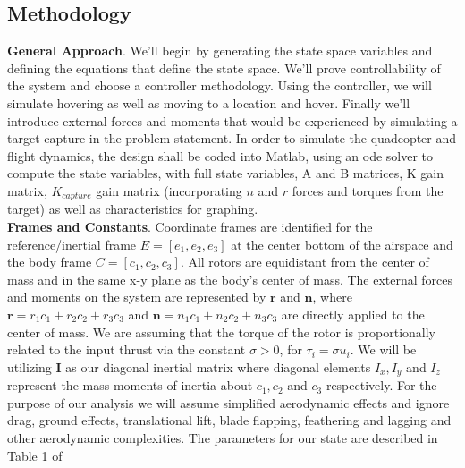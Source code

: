 \documentclass{article}
\begin{document}
\begin{multicols}{2}
\section*{Methodology}
\textbf{General Approach}.  We'll begin by generating the state space variables and defining the equations that define the state space.  We'll prove 
controllability of the system and choose a controller methodology.  Using the controller, we will simulate hovering as well as moving to a 
location and hover.  Finally we'll introduce external forces and moments that would be experienced by simulating a target capture in the 
problem statement.  In order to simulate the quadcopter and flight dynamics, the design shall be coded into Matlab, using an ode solver to compute the state variables, with full state variables, A and B matrices, K gain matrix, $K_{capture}$ gain matrix (incorporating $n$ and $r$ forces and torques from the target) 
as well as characteristics for graphing.\\
\noindent \textbf{Frames and Constants}.  Coordinate frames are identified for the reference/inertial frame $E={[e_1, e_2, e_3]}$ at the center bottom of the airspace and the 
body frame $C={[c_1, c_2, c_3]}$.  All rotors are equidistant from the center of mass and in the same x-y plane as the body's 
center of mass.  The external forces and moments on the system are represented by $\boldsymbol{r}$ and $\boldsymbol{n}$, where 
$\boldsymbol{r} = r_1 c_1 + r_2 c_2 + r_3 c_3$ and $\boldsymbol{n} = n_1 c_1 + n_2 c_2 + n_3 c_3$ are directly applied to the center 
of mass. We are assuming that the torque of the rotor is proportionally related to the input thrust via the constant $\sigma>0$, for $
\tau_i = \sigma u_i$. We will be utilizing $\boldsymbol{I}$ as our diagonal inertial matrix where diagonal elements  $I_x, I_y $ and 
$I_z$ represent the mass moments of inertia about $c_1, c_2 $ and $c_3$ respectively.  For the purpose of our analysis we will assume simplified aerodynamic effects and ignore 
 drag, ground effects, translational lift, blade flapping, feathering and lagging and other aerodynamic complexities. The parameters for our state are described in Table 1 of \cite{FaalP}\\


\end{multicols}
\end{document}
